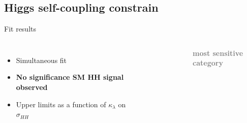 \subsection{Higgs self-coupling constrain}

\begin{frame}{Fit results}

\begin{columns}
\begin{itemize}
    \item Simultaneous fit 
    \item \textbf{\textcolor{HHred}{No significance SM HH signal observed}}
    \item Upper limits as a function of $\kappa_{\lambda}$ on $\sigma_{HH}$
\end{itemize}


\begin{figure}
    \centering
\end{figure}

\begin{center}
   \textcolor{gray}{ \textbf{most sensitive category}}
\end{center}

\end{columns}    
\end{frame}


